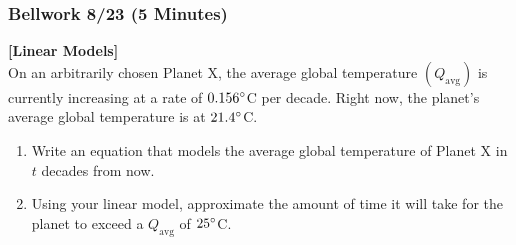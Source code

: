 \documentclass[12pt]{beamer}
\begin{document}
\begin{frame}
	\frametitle{Bellwork 8/23 (5 Minutes)}
	\initclock
	\textbf{[Linear Models]}\vspace{.2cm}\\
	\vspace*{\fill}
	On an arbitrarily chosen Planet X, the average global temperature $(Q_{\text{avg}})$ is currently increasing at a rate of $0.156\degree$C per decade. Right now, the planet's average global temperature is at $21.4\degree$C.
	\vspace*{\fill}
	\begin{enumerate}
		\item Write an equation that models the average global temperature of Planet X in $t$ decades from now. %
		      \vspace*{\fill}
		\item Using your linear model, approximate the amount of time it will take for the planet to exceed a $Q_{\text{avg}}$ of $25\degree$C. %
	\end{enumerate}
	\vspace*{\fill}
	\vspace*{\fill}
	\crono
\end{frame}
\end{document}
